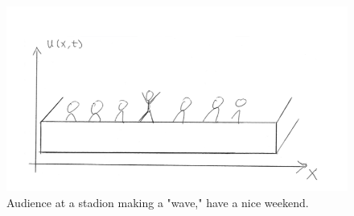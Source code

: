 \documentclass[a4paper]{article}
\begin{document}
\begin{figure}
\centering
\includegraphics[width=120mm]{TheWave}
\caption{Audience at a stadion making a "wave," have a nice weekend.}
\label{fig:The Wave}
\end{figure}
\end{document}
